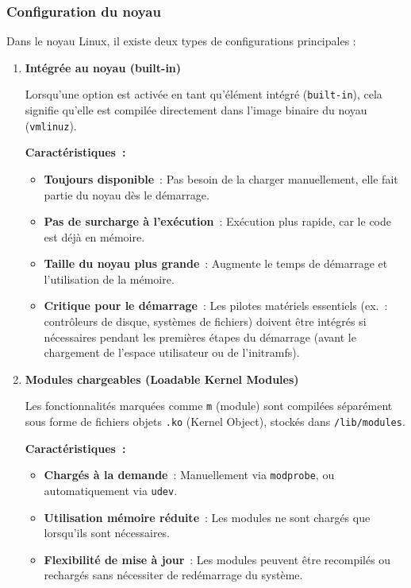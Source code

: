 \subsubsection{Configuration du noyau}

Dans le noyau Linux, il existe deux types de configurations principales :

\begin{enumerate}
  \item \textbf{Intégrée au noyau (built-in)}

  Lorsqu'une option est activée en tant qu’élément intégré (\texttt{built-in}), cela signifie qu’elle est compilée directement dans l’image binaire du noyau (\texttt{vmlinuz}).

  \textbf{Caractéristiques :}
  \begin{itemize}
    \item \textbf{Toujours disponible} : Pas besoin de la charger manuellement, elle fait partie du noyau dès le démarrage.
    \item \textbf{Pas de surcharge à l’exécution} : Exécution plus rapide, car le code est déjà en mémoire.
    \item \textbf{Taille du noyau plus grande} : Augmente le temps de démarrage et l’utilisation de la mémoire.
    \item \textbf{Critique pour le démarrage} : Les pilotes matériels essentiels (ex. : contrôleurs de disque, systèmes de fichiers) doivent être intégrés si nécessaires pendant les premières étapes du démarrage (avant le chargement de l’espace utilisateur ou de l’initramfs).
  \end{itemize}

  \item \textbf{Modules chargeables (Loadable Kernel Modules)}

  Les fonctionnalités marquées comme \texttt{m} (module) sont compilées séparément sous forme de fichiers objets \texttt{.ko} (Kernel Object), stockés dans \texttt{/lib/modules}.

  \textbf{Caractéristiques :}
  \begin{itemize}
    \item \textbf{Chargés à la demande} : Manuellement via \texttt{modprobe}, ou automatiquement via \texttt{udev}.
    \item \textbf{Utilisation mémoire réduite} : Les modules ne sont chargés que lorsqu’ils sont nécessaires.
    \item \textbf{Flexibilité de mise à jour} : Les modules peuvent être recompilés ou rechargés sans nécessiter de redémarrage du système.
  \end{itemize}
\end{enumerate}




